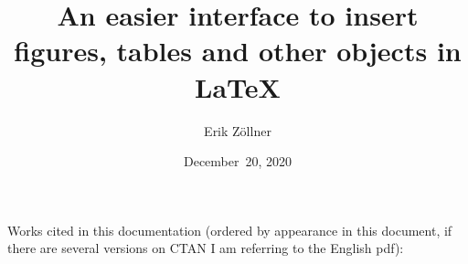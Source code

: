 \documentclass[a4paper]{ltxdoc}
\title{An easier interface to insert figures, tables and other objects in \LaTeX}
\author{Erik Zöllner}
\date{December~20, 2020}
\newcommand{\myinput}[1]{\unskip}
\begin{document}
	\myinput{undescribed-keywords}
	\myinput{content/titlepage}
	\myinput{content/examples}
	\myinput{content/names}
	\myinput{content/documentation}
	\myinput{content/installation}
	\myinput{content/bug-reports-and-contributions}
	\myinput{content/license}

	\appendix
	\myinput{content/motivation}
	\myinput{content/used-packages}
	\myinput{content/other-packages}

	\section{\refname}
	Works cited in this documentation (ordered by appearance in this document,
	if there are several versions on CTAN I am referring to the English pdf):
	\printbibliography[heading=none]

\end{document}
